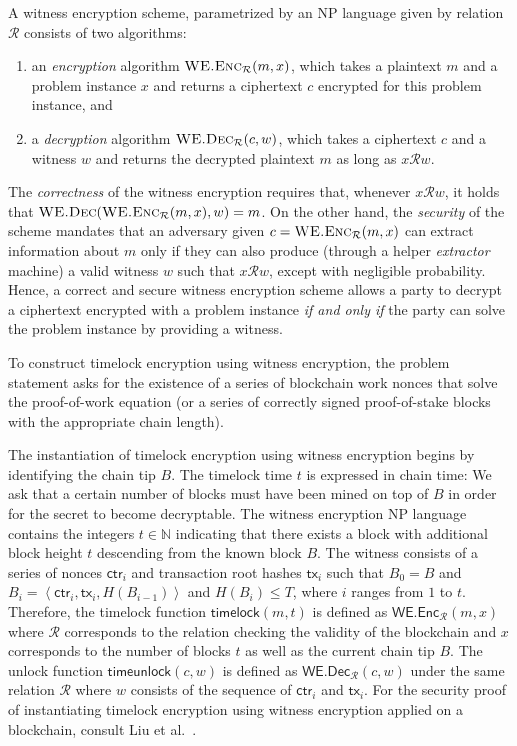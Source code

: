 A witness encryption scheme, parametrized by an \textsc{NP} language given by relation $\mathcal{R}$
consists of two algorithms:

\begin{enumerate}
  \item an \emph{encryption} algorithm $\textsc{WE.Enc}_\mathcal{R}(m, x)$, which takes a plaintext
        $m$ and a problem instance $x$ and returns a ciphertext $c$ encrypted for this problem instance,
        and
  \item a \emph{decryption} algorithm $\textsc{WE.Dec}_\mathcal{R}(c, w)$, which takes a ciphertext
        $c$ and a witness $w$ and returns the decrypted plaintext $m$ as long as $x \mathcal{R} w$.
\end{enumerate}

The \emph{correctness} of the witness encryption requires that, whenever $x \mathcal{R} w$, it holds
that $\textsc{WE.Dec}(\textsc{WE.Enc}_\mathcal{R}(m, x), w) = m$. On the other hand, the \emph{security}
of the scheme mandates that an adversary
given $c = \textsc{WE.Enc}_\mathcal{R}(m, x)$
can extract information about $m$
only if they can also produce
(through a helper \emph{extractor} machine)
a valid witness $w$ such that $x \mathcal{R} w$, except with negligible probability.
Hence, a correct and secure witness encryption scheme allows a party to decrypt a ciphertext encrypted
with a problem instance \emph{if and only if} the party can solve the problem instance by providing a
witness.

To construct timelock encryption using witness encryption, the problem statement asks for the
existence of a series of blockchain work nonces that solve the proof-of-work equation (or a series
of correctly signed proof-of-stake blocks with the appropriate chain length).

The instantiation of timelock encryption using witness encryption
begins by identifying the chain tip $B$. The timelock time $t$
is expressed in chain time: We ask that a certain number of blocks must have been mined on top of $B$
in order for the secret to become decryptable. The witness encryption \textsc{NP} language contains
the integers $t \in \mathbb{N}$ indicating that there exists a block with additional block height
$t$ descending from the known block $B$. The witness consists of a series of nonces $\textsf{ctr}_i$
and transaction root hashes $\textsf{tx}_i$ such that
$B_0 = B$ and
$B_i = \left<\textsf{ctr}_i, \textsf{tx}_i, H(B_{i-1})\right>$
and $H(B_i) \leq T$,
where $i$ ranges from $1$ to $t$. Therefore, the timelock function $\textsf{timelock}(m, t)$ is defined
as $\textsf{WE.Enc}_\mathcal{R}(m, x)$ where $\mathcal{R}$ corresponds to the relation checking the
validity of the blockchain and $x$ corresponds to the number of blocks $t$ as well as the current
chain tip $B$. The unlock function $\textsf{timeunlock}(c, w)$ is defined as
$\textsf{WE.Dec}_\mathcal{R}(c, w)$ under the same relation $\mathcal{R}$ where $w$ consists of
the sequence of $\textsf{ctr}_i$ and $\textsf{tx}_i$. For the security proof of instantiating timelock
encryption using witness encryption applied on a blockchain, consult Liu et al.~\cite{timelock-bitcoin}.

